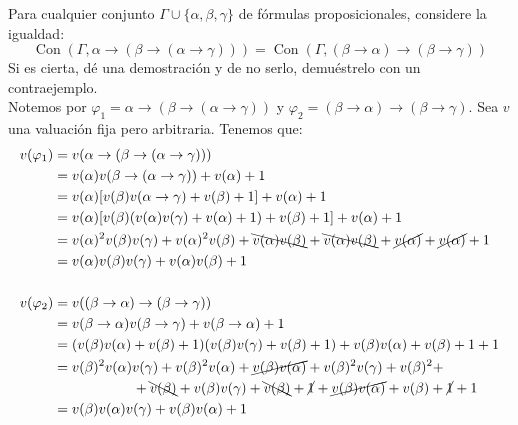 \documentclass[12pt]{article}
\DeclareMathOperator{\Con}{Con}
\begin{document}
    \begin{ejercicio}
        Para cualquier conjunto $\Gamma \cup \{\alpha,\beta,\gamma\}$ de fórmulas proposicionales, considere la igualdad:
        \begin{equation*}
            \Con(\Gamma, \alpha\rightarrow \left(\beta\rightarrow \left(\alpha\rightarrow \gamma\right)\right))
            = \Con(\Gamma, \left(\beta\rightarrow\alpha\right)\rightarrow\left(\beta\rightarrow\gamma\right))
        \end{equation*}
        Si es cierta, dé una demostración y de no serlo, demuéstrelo con un contraejemplo.\\

        Notemos por $\varphi_1=\alpha\rightarrow \left(\beta\rightarrow \left(\alpha\rightarrow \gamma\right)\right)$ y $\varphi_2=\left(\beta\rightarrow\alpha\right)\rightarrow\left(\beta\rightarrow\gamma\right)$.
        Sea $v$ una valuación fija pero arbitraria. Tenemos que:
        \begin{align*}
            v(\varphi_1) &= v(\alpha\rightarrow \left(\beta\rightarrow \left(\alpha\rightarrow \gamma\right)\right)) \\
            &= v(\alpha)v(\beta\rightarrow \left(\alpha\rightarrow \gamma\right)) + v(\alpha) + 1 \\
            &= v(\alpha)[v(\beta)v(\alpha\rightarrow \gamma) + v(\beta) + 1] + v(\alpha) + 1 \\ 
            &= v(\alpha)[v(\beta)(v(\alpha)v(\gamma)+v(\alpha)+1) + v(\beta) + 1] + v(\alpha) + 1 \\
            &= v(\alpha)^2v(\beta)v(\gamma) + v(\alpha)^2v(\beta) + \bcancel{v(\alpha)v(\beta)} + \bcancel{v(\alpha)v(\beta)} +\cancel{v(\alpha)}+ \cancel{v(\alpha)} + 1 \\
            &= v(\alpha)v(\beta)v(\gamma) + v(\alpha)v(\beta) +  1 \\ \\
            v(\varphi_2) &= v(\left(\beta\rightarrow\alpha\right)\rightarrow\left(\beta\rightarrow\gamma\right)) \\
            &= v(\beta\rightarrow\alpha)v(\beta\rightarrow\gamma) + v(\beta\rightarrow\alpha) + 1 \\
            &= (v(\beta)v(\alpha) + v(\beta) + 1)(v(\beta)v(\gamma) + v(\beta) + 1) + v(\beta)v(\alpha) + v(\beta) + 1+1 \\
            &= v(\beta)^2v(\alpha)v(\gamma) + v(\beta)^2v(\alpha) + \cancel{v(\beta)v(\alpha)} + v(\beta)^2v(\gamma) + v(\beta)^2+\\& \hspace{2cm} + \bcancel{v(\beta)} + v(\beta)v(\gamma) + \bcancel{v(\beta)} + \cancel{1} + \cancel{v(\beta)v(\alpha)} + v(\beta) + \cancel{1}+1 \\
            &= v(\beta)v(\alpha)v(\gamma) + v(\beta)v(\alpha) + 1
        \end{align*}


\end{ejercicio}
\end{document}
